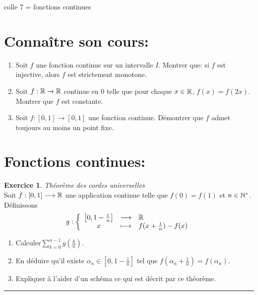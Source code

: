 \documentclass[a4paper,11pt]{article}
\theoremstyle{definition}
\newtheorem{exo}{Exercice} %
\begin{document}
	
	
	\begin{center}
		\Large \sc colle 7 = fonctions continues
	\end{center}
\raggedright

\section*{Connaître son cours:}
\begin{enumerate}
	\item Soit $f$ une fonction continue sur un intervalle $I $. Montrer que: si $f$ est injective, alors $f$ est strictement monotone. 
	\item Soit $f : \mathbb{R} \rightarrow \mathbb{R}$ continue en $0$ telle que pour chaque $x \in \mathbb{R}$,
	$f(x) = f(2x)$. Montrer que $f$ est constante.
	\item Soit $f:[0,1]\to[0,1]$ une fonction continue. Démontrer que $f$ admet toujours au moins un point fixe.
\end{enumerate}

\section*{Fonctions continues:}	


\begin{exo}\textit{Théorème des cordes universelles}\quad\\[0.25cm]
Soit $f : [0, 1] \longrightarrow \mathbb{R}$ une application continue telle que $f (0) = f (1)$ et $n \in \mathbb{N}^*$. Définissons
	$$g : \left\{\begin{array}{cll}
	\left[0, 1-\frac{1}{n}\right] &\longrightarrow & \mathbb{R}\\
	x& \longmapsto &f (x + \frac{1}{n} ) - f (x)
	\end{array}\right.$$
	
	\begin{enumerate}
		\item Calculer$\sum\limits_{k=0}^{n-1} g\left(\frac{k}{n}\right)$.
		\item En déduire qu'il existe $\alpha_n \in \left[0, 1 -\frac{1}{n}\right]$ tel que $f (\alpha_n + \frac{1}{n}) = f (\alpha_n )$.
		\item Expliquer à l'aider d'un schéma ce qui est décrit par ce théorème. 
	\end{enumerate}

	\centering
\rule{1\linewidth}{0.6pt}
\end{exo}
	
	
\end{document}
